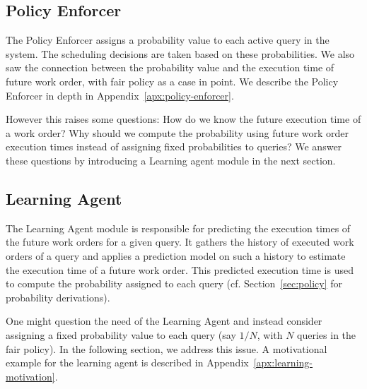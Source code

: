 \subsection{Policy Enforcer}\label{ssec:policy-enforcer}
The Policy Enforcer assigns a probability value to each active query in the system. 
The scheduling decisions are taken based on these probabilities. 
We also saw the connection between the probability value and the execution time of future work order, with fair policy as a case in point. 
We describe the Policy Enforcer in depth in Appendix~\ref{apx:policy-enforcer}.

However this raises some questions: How do we know the future execution time of a work order? 
Why should we compute the probability using future work order execution times instead of assigning fixed probabilities to queries?
We answer these questions by introducing a Learning agent module in the next section. 
 
\subsection{Learning Agent}\label{ssec:learning}
The Learning Agent module is responsible for predicting the execution times of the future work orders for a given query. 
It gathers the history of executed work orders of a query and applies a prediction model on such a history to estimate the execution time of a future work order.
This predicted execution time is used to compute the probability assigned to each query (cf. Section~\ref{sec:policy} for probability derivations).  

One might question the need of the Learning Agent and instead consider assigning a fixed probability value to each query (say $1/N$, with $N$ queries in the fair policy).
In the following section, we address this issue. 
A motivational example for the learning agent is described in Appendix~\ref{apx:learning-motivation}.

